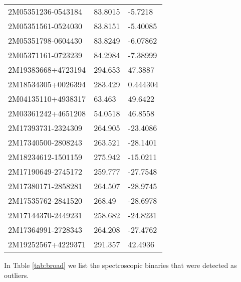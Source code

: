 \documentclass[fleqn,usenatbib]{mnras}
\begin{document}
\begin{table}
\begin{tabular}{lll}
2M05351236-0543184 &  83.8015 &   -5.7218 \\
2M05351561-0524030 &  83.8151 &  -5.40085 \\
2M05351798-0604430 &  83.8249 &  -6.07862 \\
2M05371161-0723239 &  84.2984 &  -7.38999 \\
2M19383668+4723194 &  294.653 &   47.3887 \\
2M18534305+0026394 &  283.429 &  0.444304 \\
2M04135110+4938317 &   63.463 &   49.6422 \\
2M03361242+4651208 &  54.0518 &   46.8558 \\
2M17393731-2324309 &  264.905 &  -23.4086 \\
2M17340500-2808243 &  263.521 &  -28.1401 \\
2M18234612-1501159 &  275.942 &  -15.0211 \\
2M17190649-2745172 &  259.777 &  -27.7548 \\
2M17380171-2858281 &  264.507 &  -28.9745 \\
2M17535762-2841520 &   268.49 &  -28.6978 \\
2M17144370-2449231 &  258.682 &  -24.8231 \\
2M17364991-2728343 &  264.208 &  -27.4762 \\
2M19252567+4229371 &  291.357 &   42.4936 \\
  \bottomrule
  \end{tabular}
\end{table}

In Table \ref{tab:broad} we list the spectroscopic binaries that were detected as outliers.
\end{document}
